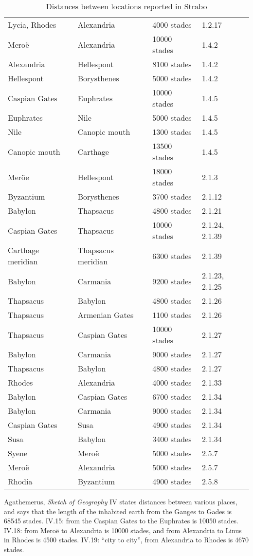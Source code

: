 \documentclass{article}
\theoremstyle{definition}
\begin{document}
\begin{table}[h!]
\caption{Distances between locations reported in Strabo}
\label{distances}
\begin{tabular}{l l l l}
Lycia, Rhodes&Alexandria&4000 stades&1.2.17\\
Mero\"e&Alexandria&10000 stades&1.4.2\\
Alexandria&Hellespont&8100 stades&1.4.2\\
Hellespont&Borysthenes&5000 stades&1.4.2\\
Caspian Gates&Euphrates&10000 stades&1.4.5\\
Euphrates&Nile&5000 stades&1.4.5\\
Nile&Canopic mouth&1300 stades&1.4.5\\
Canopic mouth&Carthage&13500 stades&1.4.5\\
Mer\"oe&Hellespont&18000 stades&2.1.3\\
Byzantium&Borysthenes&3700 stades&2.1.12\\
Babylon&Thapsacus&4800 stades&2.1.21\\
Caspian Gates&Thapsacus&10000 stades&2.1.24, 2.1.39\\
Carthage meridian&Thapsacus meridian&6300 stades&2.1.39\\
Babylon&Carmania&9200 stades&2.1.23, 2.1.25\\
Thapsacus&Babylon&4800 stades&2.1.26\\
Thapsacus&Armenian Gates&1100 stades&2.1.26\\
Thapsacus&Caspian Gates&10000 stades&2.1.27\\
Babylon&Carmania&9000 stades&2.1.27\\
Thapsacus&Babylon&4800 stades&2.1.27\\
Rhodes&Alexandria&4000 stades&2.1.33\\
Babylon&Caspian Gates&6700 stades&2.1.34\\
Babylon&Carmania&9000 stades&2.1.34\\
Caspian Gates&Susa&4900 stades&2.1.34\\
Susa&Babylon&3400 stades&2.1.34\\
Syene&Mero\"e&5000 stades&2.5.7\\
Mero\"e&Alexandria&5000 stades&2.5.7\\
Rhodia&Byzantium&4900 stades&2.5.8
\end{tabular}
\end{table}




Agathemerus, {\em Sketch of Geography} IV \cite[pp.~69--70]{agathemerus}
states distances  between various places, and says that
the length of the inhabited earth from the Ganges to Gades is 68545 stades. IV.15: 
from the Caspian Gates
to the Euphrates is 10050 stades. IV.18: from Mero\"e to Alexandria is 10000 stades, 
and from Alexandria to Linus in Rhodes is 4500 stades.
IV.19: ``city to city'', from Alexandria to Rhodes is 4670 stades.
\end{document}
